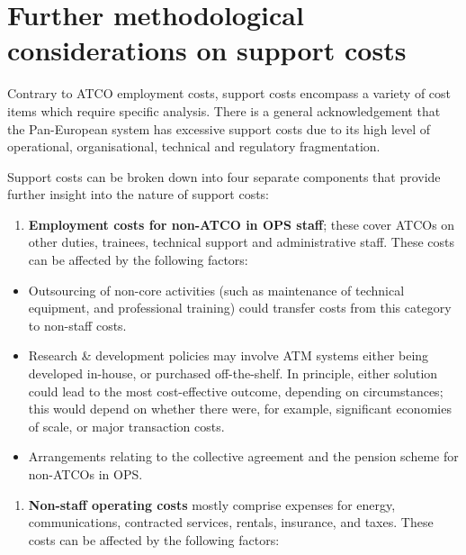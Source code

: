\documentclass[
  11pt,
  a4paperpaper,
  openany,headsepline=on,footsepline=off,DIV=12,table]{scrbook}
\providecommand{\tightlist}{%
  \setlength{\itemsep}{0pt}\setlength{\parskip}{0pt}}\usepackage{longtable,booktabs,array}
\begin{document}
\section{Further methodological considerations on support
costs}\label{further-methodological-considerations-on-support-costs}

Contrary to ATCO employment costs, support costs encompass a variety of
cost items which require specific analysis. There is a general
acknowledgement that the Pan-European system has excessive support costs
due to its high level of operational, organisational, technical and
regulatory fragmentation.

Support costs can be broken down into four separate components that
provide further insight into the nature of support costs:

\begin{enumerate}
\def\labelenumi{\alph{enumi})}
\tightlist
\item
  \textbf{Employment costs for non-ATCO in OPS staff}; these cover ATCOs
  on other duties, trainees, technical support and administrative staff.
  These costs can be affected by the following factors:
\end{enumerate}

\begin{itemize}
\item
  Outsourcing of non-core activities (such as maintenance of technical
  equipment, and professional training) could transfer costs from this
  category to non-staff costs.
\item
  Research \& development policies may involve ATM systems either being
  developed in-house, or purchased off-the-shelf. In principle, either
  solution could lead to the most cost-effective outcome, depending on
  circumstances; this would depend on whether there were, for example,
  significant economies of scale, or major transaction costs.
\item
  Arrangements relating to the collective agreement and the pension
  scheme for non-ATCOs in OPS.
\end{itemize}

\begin{enumerate}
\def\labelenumi{\alph{enumi})}
\setcounter{enumi}{1}
\tightlist
\item
  \textbf{Non-staff operating costs} mostly comprise expenses for
  energy, communications, contracted services, rentals, insurance, and
  taxes. These costs can be affected by the following factors:
\end{enumerate}
\end{document}
